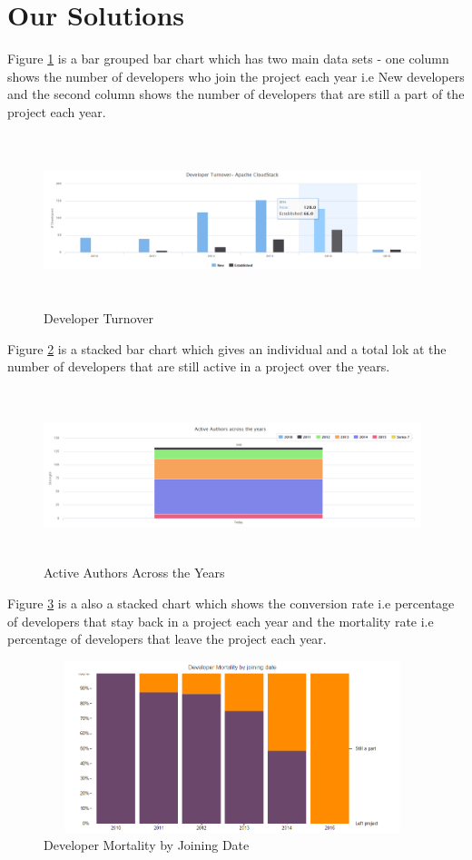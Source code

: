 \documentclass[seploa]{beavtex}
\begin{document}
\section{Our Solutions}
Figure \ref{fig:devTurn} is a bar grouped bar chart which has two main data sets - one column shows the number of developers who join the project each year i.e New developers and the second column shows the number of developers that are still a part of the project each year.

\begin{figure}[H]
\centering
\includegraphics[width=110mm,height=50mm]{image1.PNG}
\caption{Developer Turnover}
\label{fig:devTurn}
\end{figure}

Figure \ref{fig:actAuth} is a stacked bar chart which gives an individual and a total lok at the number of developers that are still active in a project over the years.

\begin{figure}[H]
\centering
\includegraphics[width=110mm,height=50mm]{image2.PNG}
\caption{Active Authors Across the Years}
\label{fig:actAuth}
\end{figure}

Figure \ref{fig:devMort} is a also a stacked chart which shows the conversion rate i.e percentage of developers that stay back in a project each year and the mortality rate i.e percentage of developers that leave the project each year.

\begin{figure}[H]
\centering
\includegraphics[width=110mm,height=50mm]{image3.PNG}
\caption{Developer Mortality by Joining Date}
\label{fig:devMort}
\end{figure}
\end{document}
